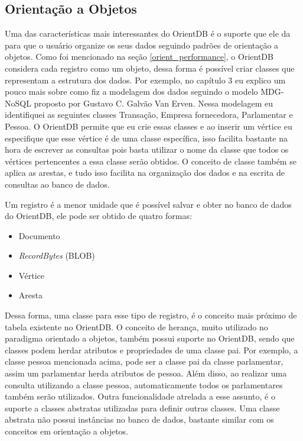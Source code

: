 \subsection{Orientação a Objetos} \label{orient_object}

	Uma das características mais interessantes do OrientDB é o suporte que ele da para que o usuário organize os seus dados seguindo padrões de orientação a objetos. Como foi mencionado na seção \ref{orient_performance}, o OrientDB considera cada registro como um objeto, dessa forma é possível criar classes que representam a estrutura dos dados. Por exemplo, no capítulo 3 eu explico um pouco mais sobre como fiz a modelagem dos dados seguindo o modelo MDG-NoSQL proposto por Gustavo C. Galvão Van Erven\cite{mdgnosql}. Nessa modelagem eu identifiquei as seguintes classes Transação, Empresa fornecedora, Parlamentar e Pessoa. O OrientDB permite que eu crie essas classes e ao inserir um vértice eu especifique que esse vértice é de uma classe específica, isso facilita bastante na hora de escrever as consultas pois basta utilizar o nome da classe que todos os vértices pertencentes a essa classe serão obtidos. O conceito de classe também se aplica as arestas, e tudo isso facilita na organização dos dados e na escrita de consultas ao banco de dados.
	
	Um registro é a menor unidade que é possível salvar e obter no banco de dados do OrientDB, ele pode ser obtido de quatro formas:
	
	\begin{itemize}
		\item Documento
		\item \textit{RecordBytes} (BLOB)
		\item Vértice
		\item Aresta
	\end{itemize}
	
	Dessa forma, uma classe para esse tipo de registro, é o conceito mais próximo de tabela existente no OrientDB. O conceito de herança, muito utilizado no paradigma orientado a objetos, também possui suporte no OrientDB, sendo que classes podem herdar atributos e propriedades de uma classe pai. Por exemplo, a classe pessoa mencionada acima, pode ser a classe pai da classe parlamentar, assim um parlamentar herda atributos de pessoa. Além disso, ao realizar uma consulta utilizando a classe pessoa, automaticamente todos os parlamentares também serão utilizados. Outra funcionalidade atrelada a esse assunto, é o suporte a classes abstratas utilizadas para definir outras classes. Uma classe abstrata não possui instâncias no banco de dados, bastante similar com os conceitos em orientação a objetos. 
	
